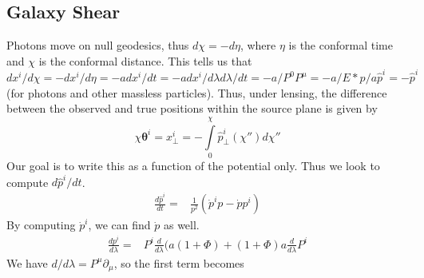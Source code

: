 \subsection{Galaxy Shear}
Photons move on null geodesics, thus $d\chi = -d\eta$, where $\eta$ is the conformal time and $\chi$ is the conformal distance. This tells us that $dx^i/d\chi = -dx^i/d\eta = -a dx^i/dt = -a dx^i/d\lambda d\lambda/dt = -a/P^0 P^\mu = -a / E * p/a \hat{p}^i = -\hat{p}^i$ (for photons and other massless particles).
Thus, under lensing, the difference between the observed and true positions within the source plane is given by
\begin{equation}
	\chi\mathbf{\theta}^i = x_\perp^i = -\int\limits_0^\chi \hat{p}^i_\perp(\chi'') d\chi''
\end{equation}
Our goal is to write this as a function of the potential only. Thus we look to compute $d\hat{p}^i/dt$.
\begin{equation}
	\begin{split}
		\frac{d\hat{p}^i}{dt} %
		=& \frac{1}{p^2}(\dot{p}^i p - \dot{p}p^i)
	\end{split}
\end{equation}
By computing $\dot p^i$, we can find $\dot p$ as well.
\begin{equation}
	\begin{split}
		\frac{dp^i}{d\lambda} %
		=& P^i\frac{d}{d\lambda}(a(1+\Phi)+(1+\Phi)a\frac{d}{d\lambda}P^i
	\end{split}
\end{equation}
We have $d/d\lambda = P^\mu \partial_\mu$, so the first term becomes
